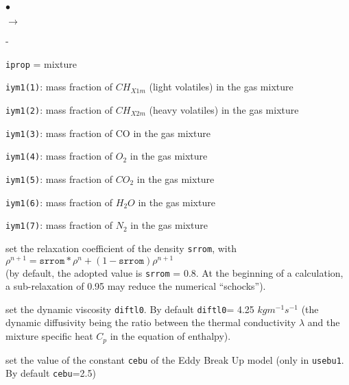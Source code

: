 {{\begin{list}{$\bullet$}{}
\begin{list}{$\rightarrow$}{}
\begin{list}{}{}
\begin{list}{-}{}
\begin{list}{\texttt{iprop} = }{}
                            mixture
                      \item \texttt{iym1(1)}: mass fraction of
                            $CH_{X1m}$ (light volatiles) in the gas
                            mixture
                      \item \texttt{iym1(2)}: mass fraction of
                            $CH_{X2m}$ (heavy volatiles) in the gas
                            mixture
                      \item \texttt{iym1(3)}: mass fraction of
                            CO in the gas mixture
                      \item \texttt{iym1(4)}: mass fraction of
                            $O_2$ in the gas mixture
                      \item \texttt{iym1(5)}: mass fraction of
                            $CO_2$ in the gas mixture
                      \item \texttt{iym1(6)}: mass fraction of
                            $H_2O$ in the gas mixture
                      \item \texttt{iym1(7)}: mass fraction of
                            $N_2$ in the gas mixture
                     \end{list}
              \end{list}
             \end{list}
      \end{list}

 \item set the relaxation coefficient of the density \texttt{srrom}, with \\
$\rho^{n+1}=\texttt{srrom}*\rho^{n}+(1-\texttt{srrom})\rho^{n+1}$\\
(by default, the adopted value is \texttt{srrom} = 0.8. At the
      beginning of a calculation, a sub-relaxation of 0.95 may reduce
      the numerical ``schocks'').

 \item set the dynamic viscosity \texttt{diftl0}. By default
      \texttt{diftl0}= 4.25 $kgm^{-1}s^{-1}$
(the dynamic diffusivity being the ratio between the thermal
      conductivity $\lambda$ and the mixture specific heat $C_p$ in the
      equation of enthalpy).

 \item set the value of the constant \texttt{cebu} of the Eddy Break
      Up model (only in \texttt{usebu1}. By default \texttt{cebu}=2.5)
\end{list}

}}
